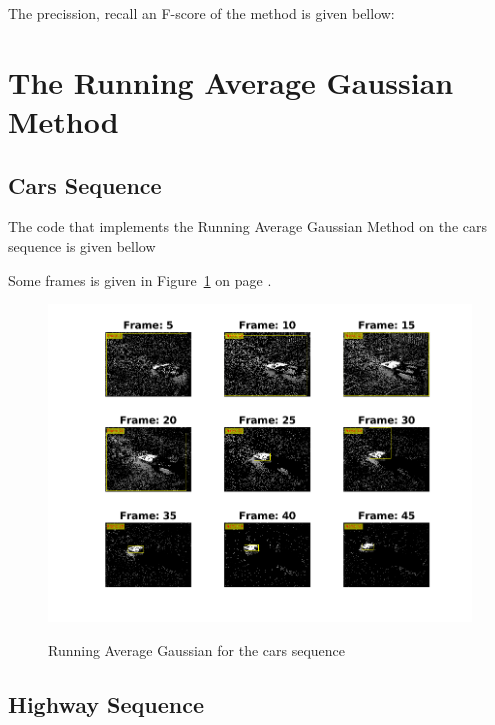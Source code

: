 \documentclass[a4paper,12pt]{article}
\begin{document}
\vspace{10pt}

The precission, recall an F-score of the method is given bellow:


\section{The Running Average Gaussian Method}

\subsection{Cars Sequence}

The code that implements the Running Average Gaussian Method on the cars sequence is given bellow 

\vspace{10pt}

\vspace{30pt}

Some frames is given in Figure~\ref{fig:a3_gaussian_cars} on page \pageref{fig:a3_gaussian_cars}.

\begin{figure}[Ht]
\centering
\includegraphics{../Videos/a3_gaussian.png}
\label{fig:a3_gaussian_cars}
\caption{Running Average Gaussian for the cars sequence}
\end{figure}
 

\subsection{Highway Sequence}
\end{document}

